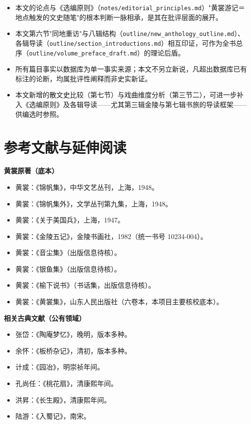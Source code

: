 \documentclass[UTF8,fontset=none,zihao=-4,a4paper]{ctexart}
\newcommand{\fb}{\CJKfamily{zhfb}}
\begin{document}
\begin{itemize}
\item 本文的论点与《选编原则》（\texttt{notes/editorial\_principles.md}）"黄裳游记＝地点触发的文史随笔"的根本判断一脉相承，是其在批评层面的展开。
\item 本文第六节"同地重访"与八辑结构（\texttt{outline/new\_anthology\_outline.md}）、各辑导读（\texttt{outline/section\_introductions.md}）相互印证，可作为全书总序（\texttt{outline/volume\_preface\_draft.md}）的理论后盾。
\item 所有篇目事实以数据库为单一事实来源；本文不另立新说，凡超出数据库已有标注的论断，均属批评性阐释而非史实新证。
\item 本文新增的散文史比较（第七节）与戏曲维度分析（第三节二），可进一步补入《选编原则》及各辑导读——尤其第三辑金陵与第七辑书旅的导读框架——供编选时参照。
\end{itemize}


\section{参考文献与延伸阅读}


\textbf{黄裳原著（底本）}

\begin{itemize}
\item 黄裳：《锦帆集》，中华文艺丛刊，上海，1948。
\item 黄裳：《锦帆集外》，文学丛刊第九集，上海，1948。
\item 黄裳：《关于美国兵》，上海，1947。
\item 黄裳：《金陵五记》，金陵书画社，1982（统一书号 10234-004）。
\item 黄裳：《音尘集》（出版信息待核）。
\item 黄裳：《银鱼集》（出版信息待核）。
\item 黄裳：《榆下说书》（书话集，出版信息待核）。
\item 黄裳：《黄裳集》，山东人民出版社（六卷本，本项目主要核校底本）。
\end{itemize}


\textbf{相关古典文献（公有领域）}

\begin{itemize}
\item 张岱：《陶庵梦忆》，晚明，版本多种。
\item 余怀：《板桥杂记》，清初，版本多种。
\item 计成：《园冶》，明崇祯年间。
\item 孔尚任：《桃花扇》，清康熙年间。
\item 洪{\fb 昇}：《长生殿》，清康熙年间。
\item 陆游：《入蜀记》，南宋。
\end{itemize}
\end{document}
